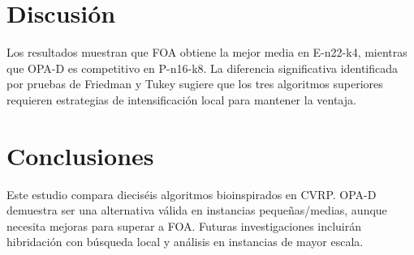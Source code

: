 \documentclass[conference]{IEEEtran}
\begin{document}
\section{Discusión}
Los resultados muestran que FOA obtiene la mejor media en E-n22-k4, mientras que OPA-D es competitivo en P-n16-k8. La diferencia significativa identificada por pruebas de Friedman y Tukey sugiere que los tres algoritmos superiores requieren estrategias de intensificación local para mantener la ventaja.

\section{Conclusiones}
Este estudio compara dieciséis algoritmos bioinspirados en CVRP. OPA-D demuestra ser una alternativa válida en instancias pequeñas/medias, aunque necesita mejoras para superar a FOA. Futuras investigaciones incluirán hibridación con búsqueda local y análisis en instancias de mayor escala.



\end{document}
